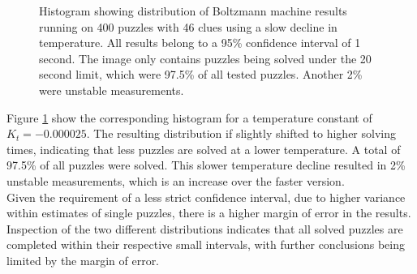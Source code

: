 \documentclass[a4paper,11pt]{kth-mag}
\begin{document}
\begin{figure}[here] 
\noindent{}
\vspace{-15pt}
\caption{Histogram showing distribution of Boltzmann machine results running on 400 puzzles with 46 clues using a slow decline in temperature. All results belong to a 95\% confidence interval of 1 second. The image only contains puzzles being solved under the 20 second limit, which were 97.5\% of all tested puzzles. Another 2\% were unstable measurements.}
\label{fig:boltzmannMedium}
\end{figure}

Figure \ref{fig:boltzmannMedium} show the corresponding histogram for a temperature constant of $K_t = -0.000025$.
The resulting distribution if slightly shifted to higher solving times, indicating that less puzzles are solved at a lower temperature.
A total of 97.5\% of all puzzles were solved.
This slower temperature decline resulted in 2\% unstable measurements, which is an increase over the faster version. \\

Given the requirement of a less strict confidence interval, due to higher variance within estimates of single puzzles, there is a higher margin of error in the results.
Inspection of the two different distributions indicates that all solved puzzles are completed within their respective small intervals, with further conclusions being limited by the margin of error. \\
\end{document}
